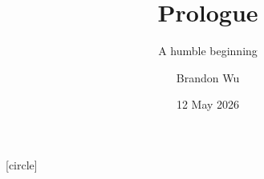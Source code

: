 \documentclass[aspectratio=169, handout]{beamer}
\title{Prologue} %
\subtitle{A humble beginning} %
\date{12 May 2026} %
\author{Brandon Wu} %
\newif\ifcolorlambda
\begin{document}
\ifweb
    \renewcommand{\pause}{}
\fi

[circle]

\begin{frame}[plain]
    \colorlambdatrue
    \titlepage
\end{frame}

\end{document}
